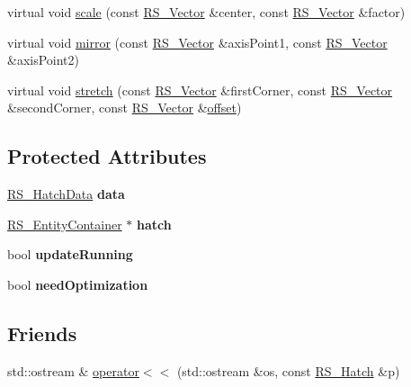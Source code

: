 \begin{DoxyCompactItemize}
\item 
virtual void \hyperlink{classRS__Hatch_a248bf7c36b81652fda481e976dd62b09}{scale} (const \hyperlink{classRS__Vector}{R\-S\-\_\-\-Vector} \&center, const \hyperlink{classRS__Vector}{R\-S\-\_\-\-Vector} \&factor)
\item 
virtual void \hyperlink{classRS__Hatch_acdb3096869d211692fa20cfcec6bc5c2}{mirror} (const \hyperlink{classRS__Vector}{R\-S\-\_\-\-Vector} \&axis\-Point1, const \hyperlink{classRS__Vector}{R\-S\-\_\-\-Vector} \&axis\-Point2)
\item 
virtual void \hyperlink{classRS__Hatch_aa60f4ae4e78e7d53b35be9a425f78117}{stretch} (const \hyperlink{classRS__Vector}{R\-S\-\_\-\-Vector} \&first\-Corner, const \hyperlink{classRS__Vector}{R\-S\-\_\-\-Vector} \&second\-Corner, const \hyperlink{classRS__Vector}{R\-S\-\_\-\-Vector} \&\hyperlink{classRS__Entity_aa296d21b9aac99161d386ce2f60f0fea}{offset})
\end{DoxyCompactItemize}
\subsection*{Protected Attributes}
\begin{DoxyCompactItemize}
\item 
\hypertarget{classRS__Hatch_af25b899800d818f8aeae84170f1f1cd7}{\hyperlink{classRS__HatchData}{R\-S\-\_\-\-Hatch\-Data} {\bfseries data}}\label{classRS__Hatch_af25b899800d818f8aeae84170f1f1cd7}

\item 
\hypertarget{classRS__Hatch_a58a3fe3db17bcc24aaacc5196ba7ecb4}{\hyperlink{classRS__EntityContainer}{R\-S\-\_\-\-Entity\-Container} $\ast$ {\bfseries hatch}}\label{classRS__Hatch_a58a3fe3db17bcc24aaacc5196ba7ecb4}

\item 
\hypertarget{classRS__Hatch_a95c9d30f1f417e3c28888376254d79e9}{bool {\bfseries update\-Running}}\label{classRS__Hatch_a95c9d30f1f417e3c28888376254d79e9}

\item 
\hypertarget{classRS__Hatch_a04870952ef8e84416adb2a4ffb73b39d}{bool {\bfseries need\-Optimization}}\label{classRS__Hatch_a04870952ef8e84416adb2a4ffb73b39d}

\end{DoxyCompactItemize}
\subsection*{Friends}
\begin{DoxyCompactItemize}
\item 
std\-::ostream \& \hyperlink{classRS__Hatch_a5b267a9e959fc58ff5aaa63d0bbfef2d}{operator$<$$<$} (std\-::ostream \&os, const \hyperlink{classRS__Hatch}{R\-S\-\_\-\-Hatch} \&p)
\end{DoxyCompactItemize}
